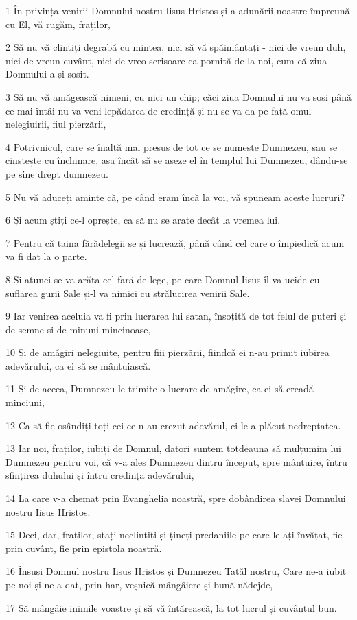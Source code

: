 \par 1 În privința venirii Domnului nostru Iisus Hristos și a adunării noastre împreună cu El, vă rugăm, fraților,
\par 2 Să nu vă clintiți degrabă cu mintea, nici să vă spăimântați - nici de vreun duh, nici de vreun cuvânt, nici de vreo scrisoare ca pornită de la noi, cum că ziua Domnului a și sosit.
\par 3 Să nu vă amăgească nimeni, cu nici un chip; căci ziua Domnului nu va sosi până ce mai întâi nu va veni lepădarea de credință și nu se va da pe față omul nelegiuirii, fiul pierzării,
\par 4 Potrivnicul, care se înalță mai presus de tot ce se numește Dumnezeu, sau se cinstește cu închinare, așa încât să se așeze el în templul lui Dumnezeu, dându-se pe sine drept dumnezeu.
\par 5 Nu vă aduceți aminte că, pe când eram încă la voi, vă spuneam aceste lucruri?
\par 6 Și acum știți ce-l oprește, ca să nu se arate decât la vremea lui.
\par 7 Pentru că taina fărădelegii se și lucrează, până când cel care o împiedică acum va fi dat la o parte.
\par 8 Și atunci se va arăta cel fără de lege, pe care Domnul Iisus îl va ucide cu suflarea gurii Sale și-l va nimici cu strălucirea venirii Sale.
\par 9 Iar venirea aceluia va fi prin lucrarea lui satan, însoțită de tot felul de puteri și de semne și de minuni mincinoase,
\par 10 Și de amăgiri nelegiuite, pentru fiii pierzării, fiindcă ei n-au primit iubirea adevărului, ca ei să se mântuiască.
\par 11 Și de aceea, Dumnezeu le trimite o lucrare de amăgire, ca ei să creadă minciuni,
\par 12 Ca să fie osândiți toți cei ce n-au crezut adevărul, ci le-a plăcut nedreptatea.
\par 13 Iar noi, fraților, iubiți de Domnul, datori suntem totdeauna să mulțumim lui Dumnezeu pentru voi, că v-a ales Dumnezeu dintru început, spre mântuire, întru sfințirea duhului și întru credința adevărului,
\par 14 La care v-a chemat prin Evanghelia noastră, spre dobândirea slavei Domnului nostru Iisus Hristos.
\par 15 Deci, dar, fraților, stați neclintiți și țineți predaniile pe care le-ați învățat, fie prin cuvânt, fie prin epistola noastră.
\par 16 Însuși Domnul nostru Iisus Hristos și Dumnezeu Tatăl nostru, Care ne-a iubit pe noi și ne-a dat, prin har, veșnică mângâiere și bună nădejde,
\par 17 Să mângâie inimile voastre și să vă întărească, la tot lucrul și cuvântul bun.

